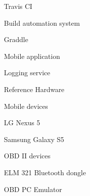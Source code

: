 Travis CI

\secc Build automation system

Graddle


\secc Mobile application

\secc Logging service

\sec Reference Hardware

\secc Mobile devices

\seccc LG Nexus 5

\seccc Samsung Galaxy S5

\secc OBD II devices

\seccc ELM 321 Bluetooth dongle 

\seccc OBD PC Emulator
 





